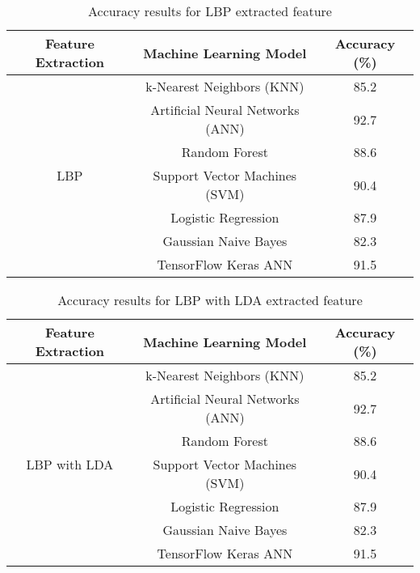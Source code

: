 \documentclass[a4paper]{article}
\theoremstyle{plain}
\theoremstyle{definition}
\begin{document}
\begin{table}[htbp]
\centering
\Large
\caption{Accuracy results for LBP extracted feature}
\label{tab:results}
\begin{tabular}{|c|c|c|}
\hline
\textbf{Feature Extraction} & \textbf{Machine Learning Model} & \textbf{Accuracy (\%)} \\ \hline
\multirow{7}{*}{LBP } & k-Nearest Neighbors (KNN) & 85.2 \\ \cline{2-3} 
 & Artificial Neural Networks (ANN) & 92.7 \\ \cline{2-3} 
 & Random Forest & 88.6 \\ \cline{2-3} 
 & Support Vector Machines (SVM) & 90.4 \\ \cline{2-3} 
 & Logistic Regression & 87.9 \\ \cline{2-3} 
 & Gaussian Naive Bayes & 82.3 \\ \cline{2-3} 
 & TensorFlow Keras ANN & 91.5 \\ \hline
\end{tabular}
\end{table}

\begin{table}[htbp]
\centering
\Large
\caption{Accuracy results for LBP with LDA extracted feature}
\label{tab:results}
\begin{tabular}{|c|c|c|}
\hline
\textbf{Feature Extraction} & \textbf{Machine Learning Model} & \textbf{Accuracy (\%)} \\ \hline
\multirow{7}{*}{LBP with LDA} & k-Nearest Neighbors (KNN) & 85.2 \\ \cline{2-3} 
 & Artificial Neural Networks (ANN) & 92.7 \\ \cline{2-3} 
 & Random Forest & 88.6 \\ \cline{2-3} 
 & Support Vector Machines (SVM) & 90.4 \\ \cline{2-3} 
 & Logistic Regression & 87.9 \\ \cline{2-3} 
 & Gaussian Naive Bayes & 82.3 \\ \cline{2-3} 
 & TensorFlow Keras ANN & 91.5 \\ \hline
\end{tabular}
\end{table}
\end{document}
